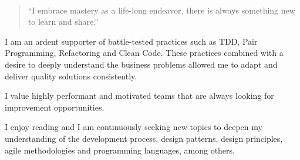 \documentclass[10pt,letterpaper,ragged2d,withhyper]{altacv}
\begin{document}
\begin{paracol}{2}
\\

% 
% 
% 
% 
% 
% 
% 


\switchcolumn


\begin{quote}
``I embrace mastery as a life-long endeavor, there is always something new to learn and share.''
\end{quote}


I am an ardent supporter of battle-tested practices such as TDD, Pair Programming, Refactoring and Clean Code. These practices combined with a desire to deeply understand the business problems allowed me to adapt and deliver quality solutions consistently.

I value highly performant and motivated teams that are always looking for improvement opportunities.

I enjoy reading and I am continuously seeking new topics to deepen my understanding of the development process, design patterns, design principles, agile methodologies and programming languages, among others.



\end{paracol}
\end{document}
